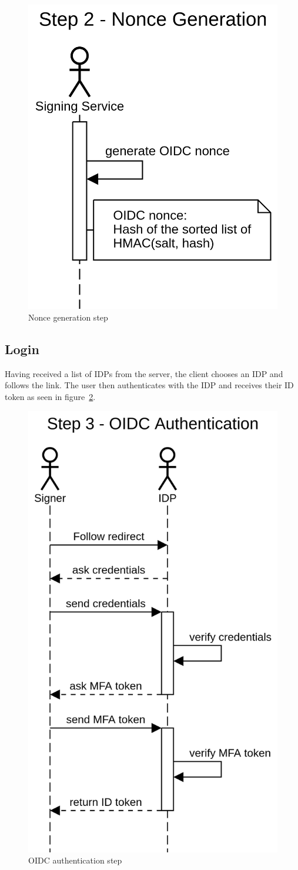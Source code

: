 \begin{figure}[H]
	\begin{center}
		\includegraphics[width=0.35\linewidth]{images/protocol_step2_nonce_generation.png}
		\caption{Nonce generation step}
		\label{fig:noncegenerationstep}
	\end{center}
\end{figure}

\subsection{Login}\label{subsec:login}

Having received a list of \gls{IDP}s from the server, the client chooses an \gls{IDP} and follows the link.
The user then authenticates with the \gls{IDP} and receives their ID token as seen in figure~\ref{fig:oidcauthenticationstep}.

\begin{figure}[H]
	\begin{center}
		\includegraphics[width=0.35\linewidth]{images/protocol_step3_oidc_authentication.png}
		\caption{OIDC authentication step}
		\label{fig:oidcauthenticationstep}
	\end{center}
\end{figure}

